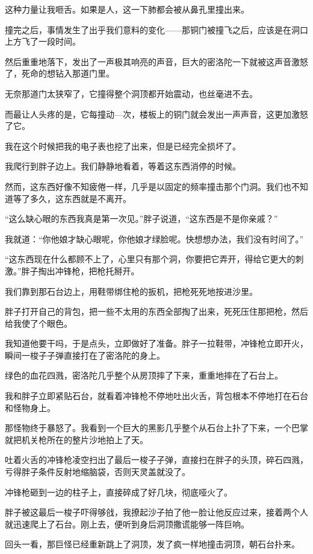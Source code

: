 这种力量让我咂舌。如果是人，这一下肺都会被从鼻孔里撞出来。

撞完之后，事情发生了出乎我们意料的变化——那铜门被撞飞之后，应该是在洞口上方飞了一段时间。

然后重重地落下，发出了一声极其响亮的声音，巨大的密洛陀一下就被这声音激怒了，死命的想钻入那道门里。

无奈那道门太狭窄了，它撞得整个洞顶都开始震动，也丝毫进不去。

而最让人头疼的是，它每撞动—次，楼板上的铜门就会发出一声声音，这更加激怒了它。

我在这个时候把我的电子表也挖了出来，但是已经完全损坏了。

我爬行到胖子边上。我们静静地看着，等着这东西消停的时候。

然而，这东西好像不知疲倦一样，几乎是以固定的频率撞击那个门洞。我们也不知道等了多久，这东西就是不离开。

“这么缺心眼的东西我真是第一次见。”胖子说道，“这东西是不是你亲戚？”

我就道：“你他娘才缺心眼呢，你他娘才绿脸呢。快想想办法，我们没有时间了。”

“这东西现在什么都顾不上了，心里只有那个洞，你要把它弄开，得给它更大的刺激。”胖子掏出冲锋枪，把枪托掰开。

我们靠到那石台边上，用鞋带绑住枪的扳机，把枪死死地按进沙里。

胖子打开自己的背包，把一些不太用的东西全部掏了出来，死死压住那把枪，然后给我使了个眼色。

我知道他要干吗，于是点头，立即做好了准备。胖子一拉鞋带，冲锋枪立即开火，瞬间一梭子子弹直接打在了密洛陀的身上。

绿色的血花四溅，密洛陀几乎整个从房顶摔了下来，重重地摔在了石台上。

我和胖子立即紧贴石台，就看着冲锋枪不停地吐出火舌，背包根本不停地打在石台和怪物身上。

那怪物终于暴怒了。我看到一个巨大的黑影几乎整个从石台上扑了下来，一个巴掌就把机关枪所在的整片沙地拍上了天。

吐着火舌的冲锋枪凌空扫出了最后一梭子子弹，直接扫在胖子的头顶，碎石四溅，亏得胖子条件反射地缩脑袋，否则天灵盖就没了。

冲锋枪砸到一边的柱子上，直接碎成了好几块，彻底哑火了。

胖子被这最后一梭子吓得够戗，我撩起沙子拍了他一脸让他反应过来，接着两个人就迅速爬上了石台。刚上去，便听到身后洞顶撒谎能够一阵巨响。

回头一看，那巨怪已经重新跳上了洞顶，发了疯一样地撞击洞顶，朝石台扑来。

